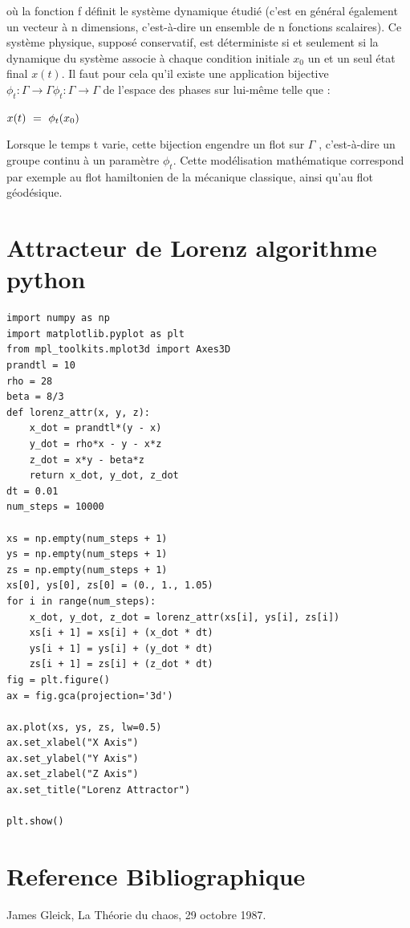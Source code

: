 \documentclass[10pt,a4paper]{article}
\begin{document}
où la fonction f définit le système dynamique étudié (c'est en général également un vecteur à n dimensions, c’est-à-dire un ensemble de n fonctions scalaires). Ce système physique, supposé conservatif, est déterministe si et seulement si la dynamique du système associe à chaque condition initiale ${\displaystyle x_{0}}$ un et un seul état final ${\displaystyle x(t)}$. Il faut pour cela qu'il existe une application bijective ${\displaystyle \phi _{t}:\Gamma \to \Gamma }\phi _{t}:\Gamma \to \Gamma$  de l'espace des phases sur lui-même telle que :\vspace{0.40cm}

\begin{math}
x(t)\ =\ \phi _{t}(x_{0})\vspace{0.40cm}
\end{math}

Lorsque le temps t varie, cette bijection engendre un flot sur ${\displaystyle \Gamma }$ , c’est-à-dire un groupe continu à un paramètre ${\displaystyle \phi _{t}}$. Cette modélisation mathématique correspond par exemple au flot hamiltonien de la mécanique classique, ainsi qu'au flot géodésique.

\newpage
\section{Attracteur de Lorenz algorithme python}
\begin{lstlisting}[style=stylepython]
import numpy as np
import matplotlib.pyplot as plt
from mpl_toolkits.mplot3d import Axes3D
prandtl = 10 
rho = 28
beta = 8/3
def lorenz_attr(x, y, z):
    x_dot = prandtl*(y - x)
    y_dot = rho*x - y - x*z
    z_dot = x*y - beta*z
    return x_dot, y_dot, z_dot
dt = 0.01
num_steps = 10000

xs = np.empty(num_steps + 1)
ys = np.empty(num_steps + 1)
zs = np.empty(num_steps + 1)
xs[0], ys[0], zs[0] = (0., 1., 1.05)
for i in range(num_steps):
    x_dot, y_dot, z_dot = lorenz_attr(xs[i], ys[i], zs[i])
    xs[i + 1] = xs[i] + (x_dot * dt)
    ys[i + 1] = ys[i] + (y_dot * dt)
    zs[i + 1] = zs[i] + (z_dot * dt)
fig = plt.figure()
ax = fig.gca(projection='3d')

ax.plot(xs, ys, zs, lw=0.5)
ax.set_xlabel("X Axis")
ax.set_ylabel("Y Axis")
ax.set_zlabel("Z Axis")
ax.set_title("Lorenz Attractor")

plt.show()
\end{lstlisting}

\section{Reference Bibliographique}
\begin{thebibliography}{1}
    James Gleick, La Théorie du chaos, 29 octobre 1987.
\end{thebibliography}
\end{document}
